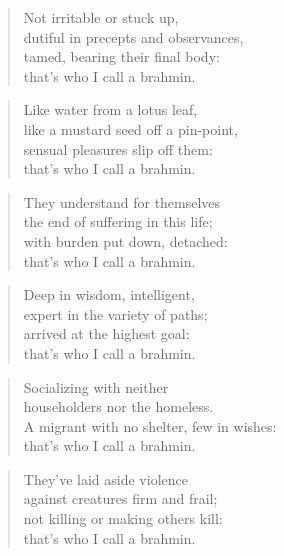 \documentclass[12pt,openany]{book}%
\begin{document}
\begin{verse}%
Not irritable or stuck up, \\
dutiful in precepts and observances, \\
tamed, bearing their final body: \\
that’s who I call a brahmin. 

%
\end{verse}

\begin{verse}%
Like water from a lotus leaf, \\
like a mustard seed off a pin-point, \\
sensual pleasures slip off them: \\
that’s who I call a brahmin. 

%
\end{verse}

\begin{verse}%
They understand for themselves \\
the end of suffering in this life; \\
with burden put down, detached: \\
that’s who I call a brahmin. 

%
\end{verse}

\begin{verse}%
Deep in wisdom, intelligent, \\
expert in the variety of paths; \\
arrived at the highest goal: \\
that’s who I call a brahmin. 

%
\end{verse}

\begin{verse}%
Socializing with neither \\
householders nor the homeless. \\
A migrant with no shelter, few in wishes: \\
that’s who I call a brahmin. 

%
\end{verse}

\begin{verse}%
They’ve laid aside violence \\
against creatures firm and frail; \\
not killing or making others kill: \\
that’s who I call a brahmin. 

%
\end{verse}
\end{document}

